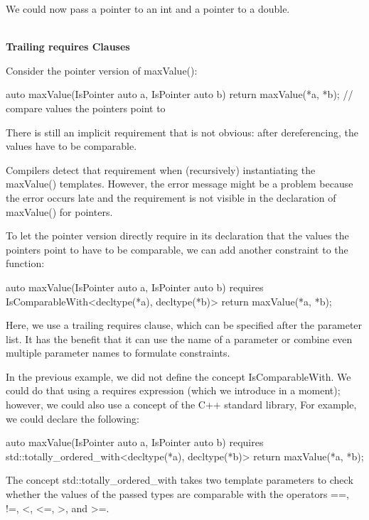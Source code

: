 We could now pass a pointer to an int and a pointer to a double.

\noindent
\hspace*{\fill} \\ %
\textbf{Trailing requires Clauses}

Consider the pointer version of maxValue():

\begin{cpp}
auto maxValue(IsPointer auto a, IsPointer auto b)
{
	return maxValue(*a, *b); // compare values the pointers point to
}
\end{cpp}

There is still an implicit requirement that is not obvious: after dereferencing, the values have to be comparable.

Compilers detect that requirement when (recursively) instantiating the maxValue() templates. However, the error message might be a problem because the error occurs late and the requirement is not visible in the declaration of maxValue() for pointers.

To let the pointer version directly require in its declaration that the values the pointers point to have to be comparable, we can add another constraint to the function:

\begin{cpp}
auto maxValue(IsPointer auto a, IsPointer auto b)
requires IsComparableWith<decltype(*a), decltype(*b)>
{
	return maxValue(*a, *b);
}
\end{cpp}

Here, we use a trailing requires clause, which can be specified after the parameter list. It has the benefit that it can use the name of a parameter or combine even multiple parameter names to formulate constraints.


In the previous example, we did not define the concept IsComparableWith. We could do that using a requires expression (which we introduce in a moment); however, we could also use a concept of the C++ standard library, For example, we could declare the following:

\begin{cpp}
auto maxValue(IsPointer auto a, IsPointer auto b)
requires std::totally_ordered_with<decltype(*a), decltype(*b)>
{
	return maxValue(*a, *b);
}
\end{cpp}

The concept std::totally\_ordered\_with takes two template parameters to check whether the values of the passed types are comparable with the operators ==, !=, <, <=, >, and >=.

